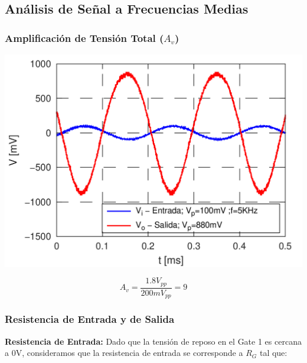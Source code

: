 \documentclass[a4paper, 10pt, spanish]{article}
\begin{document}
\subsection{Análisis de Señal a Frecuencias Medias}

\subsubsection{Amplificación de Tensión Total ($A_v$)}

\begin{center}
  \includegraphics[width=.7\textwidth]{AvTRUCHO.png}
  \label{fig:av_med}
\end{center}


\begin{equation}
  A_v=\frac{1.8V_{pp}}{200mV_{pp}}=9
\end{equation}

\subsubsection{Resistencia de Entrada y de Salida}
\textbf{Resistencia de Entrada:}
Dado que la tensión de reposo en el Gate 1 es cercana a 0V, consideramos que la resistencia de entrada se corresponde a $R_G$ tal que:
\end{document}
